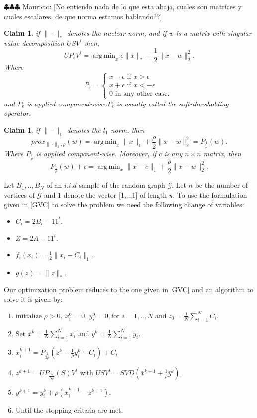 \documentclass[12pt]{amsart}
\newtheorem{claim}[lemma]{Claim}
\theoremstyle{remark}
\DeclareMathOperator*{\argmin}{arg\,min}
\newcommand{\grG}{{\mathcal{G}}}
\newcommand{\mv}[1]{{\color{red} \sf $\clubsuit\clubsuit\clubsuit$ Mauricio: [#1]}}
\begin{document}
\mv{No entiendo nada de lo que esta abajo, cuales son matrices y cuales escalares, de que norma estamos hablando??}

\begin{claim}
if $\|\cdot\|_*$ denotes the nuclear norm, and if $w$ is a matrix with singular value decomposition $USV^t$ then,
\[
UP_{\epsilon}V^t = \argmin_x \epsilon\|x\|_* + \frac{1}{2}\|x-w\|_2^2.
\]
Where
\[
P_\epsilon=\begin{cases}
x - \epsilon \text{ if } x>\epsilon \\
x+\epsilon \text{ if }x< -\epsilon\\
0 \text{ in any other case. }
\end{cases}
\]
and $P_\epsilon$ is applied component-wise.$P_\epsilon$ is usually called the soft-thresholding operator.
\end{claim}


\begin{claim}
if $\|\cdot\|_1$ denotes the $l_1$ norm, then
\[
prox_{\|\cdot\|_1,\rho}(w) = \argmin_x \|x\|_1 + \frac{\rho}{2}\|x-w\|_2^2 = P_{\frac{1}{\rho}}(w).
\]
Where $P_{\frac{1}{\rho}}$ is applied component-wise. Moreover, if $c$ is any $n \times n$ matrix, then
\[
P_{\frac{1}{\rho}}(w)+c = \argmin_x \|x-c\|_1+\frac{\rho}{2}\|x-w\|_2^2.
\]

\end{claim}

Let $B_1,..,B_N$ of an $i.i.d$ sample of the random graph $\grG$. Let $n$ be the number of vertices of $\grG$ and $1$ denote the vector [1,..,1] of length $n$. To use the formulation given in \ref{GVC} to solve the problem we need the following change of variables:


\begin{itemize}
\item $C_i = 2B_i-11^t$.
\item $Z = 2A-11^t$.
\item $f_i(x_i) = \frac{1}{2}\|x_i-C_i\|_1$.
\item $g(z)=\|z\|_*$.
\end{itemize}

Our optimization problem reduces to the one given in \ref{GVC} and an algorithm to solve it is given by:

\begin{enumerate}
\item $\text{initialize } \rho >0, \  x_i^0=0, \  y_i^0=0, \text{for } i=1,..,N \text{ and } z_0= \frac{1}{N}\sum_{i=1}^N C_i$.
\item $ \text{Set } \bar{x}^{k} = \frac{1}{N}\sum_{i=1}^N x_i $ and $\bar{y}^{k} = \frac{1}{N}\sum_{i=1}^N y_i $.
\item $x_i^{k+1}=P_{\frac{1}{2\rho}}(z^k-\frac{1}{\rho}y_i^k-C_i)+C_i$
\item $z^{k+1} = UP_{\frac{\lambda}{N\rho}}(S)V^t$ with $USV^t = SVD(\bar{x}^{k+1}+\frac{1}{\rho}\bar{y}^k)$.
\item $y^{k+1} =y_i^k + \rho(x_i^{k+1}-z^{k+1}). $ 
\item Until the stopping criteria are met.
\end{enumerate}
\end{document}
